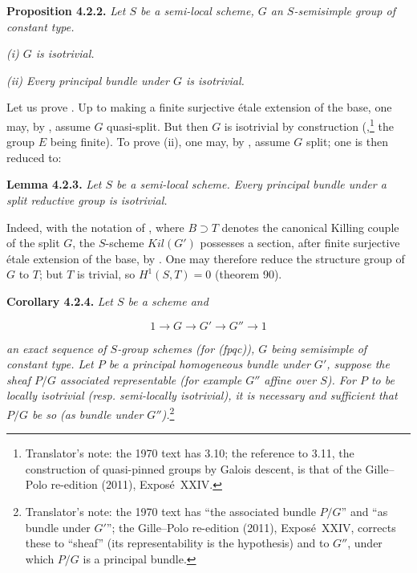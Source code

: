 \textbf{Proposition 4.2.2.} \emph{Let \(S\) be a semi-local scheme, \(G\) an \(S\)-semisimple group of constant type.}

\emph{(i) \(G\) is isotrivial.}

\emph{(ii) Every principal bundle under \(G\) is isotrivial.}

Let us prove . Up to making a finite surjective étale extension of the base, one may, by , assume \(G\)
quasi-split. But then \(G\) is isotrivial by construction (,\footnote{Translator's
note: the 1970 text has 3.10; the reference to 3.11, the construction of quasi-pinned groups by
Galois descent, is that of the Gille--Polo re-edition (2011), Exposé~XXIV.} the group \(E\) being finite). To prove (ii), one may, by
, assume \(G\) split; one is then reduced to:

\textbf{Lemma 4.2.3.} \emph{Let \(S\) be a semi-local scheme. Every principal bundle under a split reductive group is isotrivial.}

Indeed, with the notation of , where \(B \supset T\) denotes the canonical Killing couple of the split \(G\), the
\(S\)-scheme \(Kil(G')\) possesses a section, after finite surjective étale extension of the base, by . One may
therefore reduce the structure group of \(G\) to \(T\); but \(T\) is trivial, so \(H^{1}(S, T) = 0\) (theorem 90).

\textbf{Corollary 4.2.4.} \emph{Let \(S\) be a scheme and}

\[ 1 \to G \to G' \to G'' \to 1 \]

\emph{an exact sequence of \(S\)-group schemes (for (fpqc)), \(G\) being semisimple of constant type. Let \(P\) be a principal
homogeneous bundle under \(G'\), suppose the sheaf \(P / G\) associated representable (for example \(G''\)
affine over \(S\)). For \(P\) to be locally isotrivial (resp. semi-locally isotrivial), it is necessary and sufficient that
\(P / G\) be so (as bundle under \(G''\)).}\footnote{Translator's note: the 1970 text has
``the associated bundle \(P/G\)'' and ``as bundle under \(G'\)''; the Gille--Polo re-edition (2011),
Exposé~XXIV, corrects these to ``sheaf'' (its representability is the hypothesis) and to \(G''\),
under which \(P/G\) is a principal bundle.}

